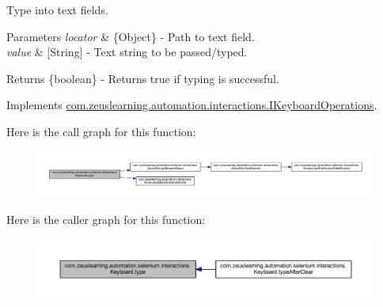 Type into text fields.


\begin{DoxyParams}{Parameters}
{\em locator} & \{Object\} -\/ Path to text field. \\
\hline
{\em value} & \mbox{[}String\mbox{]} -\/ Text string to be passed/typed.\\
\hline
\end{DoxyParams}
\begin{DoxyReturn}{Returns}
\{boolean\} -\/ Returns {\ttfamily true} if typing is successful. 
\end{DoxyReturn}


Implements \hyperlink{interfacecom_1_1zeuslearning_1_1automation_1_1interactions_1_1IKeyboardOperations_a46786f6c5426cd849127eed9ba7192a7}{com.\+zeuslearning.\+automation.\+interactions.\+I\+Keyboard\+Operations}.

Here is the call graph for this function\+:
\nopagebreak
\begin{figure}[H]
\begin{center}
\leavevmode
\includegraphics[width=350pt]{d1/d26/classcom_1_1zeuslearning_1_1automation_1_1selenium_1_1interactions_1_1Keyboard_ac169af3cdaa7e24a4ec048c70540aaa1_cgraph}
\end{center}
\end{figure}
Here is the caller graph for this function\+:
\nopagebreak
\begin{figure}[H]
\begin{center}
\leavevmode
\includegraphics[width=350pt]{d1/d26/classcom_1_1zeuslearning_1_1automation_1_1selenium_1_1interactions_1_1Keyboard_ac169af3cdaa7e24a4ec048c70540aaa1_icgraph}
\end{center}
\end{figure}
\hypertarget{classcom_1_1zeuslearning_1_1automation_1_1selenium_1_1interactions_1_1Keyboard_a2436faf2f5954d8e1d4cb326c7bb8e06}{}\label{classcom_1_1zeuslearning_1_1automation_1_1selenium_1_1interactions_1_1Keyboard_a2436faf2f5954d8e1d4cb326c7bb8e06} 
